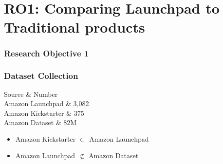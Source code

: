 \documentclass[9pt]{beamer}
\begin{document}
\section{RO1: Comparing Launchpad to Traditional products}
\begin{frame}
\frametitle{Research Objective 1}
\centering
\textcolor{black}{\LARGE {}}
\end{frame}




\begin{frame}
	\frametitle{Dataset Collection}	
	
	\vspace{5pt}
	\centering
	\begin{tcolorbox}[tab2,tabularx={X|X},title=Dataset Description, boxrule=0.8pt, width=6cm]
		Source & Number \\ \hline
		\footnotesize Amazon Launchpad & \footnotesize  3,082  \\ 
		\footnotesize Amazon Kickstarter & \footnotesize 375 \\ 
		\footnotesize Amazon Dataset & \footnotesize 	82M  \\ 
	\end{tcolorbox}
	
	\vspace{5pt}
	\begin{itemize}[label=\textcolor{blue}{\textbullet}]
		\item{Amazon Kickstarter $\subset$ Amazon Launchpad}
		\item{Amazon Launchpad $\not\subset$ Amazon Dataset}
	\end{itemize}
\end{frame}
\end{document}
